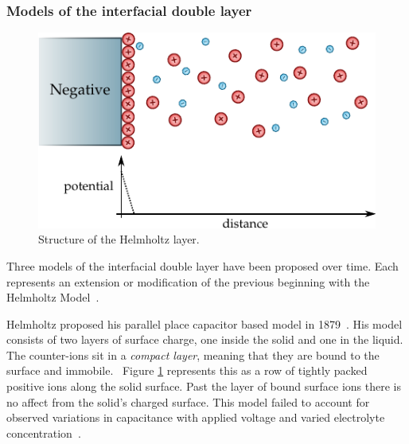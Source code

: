   \subsubsection*{Models of the interfacial double layer}

    \begin{figure}
      \begin{center}
        \includegraphics{content/introduction/graphics/model_helmholtz}
      \end{center}
      \caption{Structure of the Helmholtz layer.}
      \label{fig:doubleLayerModel_helmholtz}
    \end{figure}

    Three models of the interfacial double layer have been proposed over time.
    Each represents an extension or modification of the previous beginning with the Helmholtz Model~\cite{Horch2004}.

    Helmholtz proposed his parallel place capacitor based model in 1879~\cite{Geddes1997}.
    His model consists of two layers of surface charge, one inside the solid and one in the liquid.
    The counter-ions sit in a \emph{compact layer}, meaning that they are bound to the surface and immobile.~\cite{Salieb-Beugelaar2009}
    Figure \ref{fig:doubleLayerModel_helmholtz} represents this as a row of tightly packed positive ions along the solid surface.
    Past the layer of bound surface ions there is no affect from the solid's charged surface.
    This model failed to account for observed variations in capacitance with applied voltage and varied electrolyte concentration~\cite{Bard1980}.

